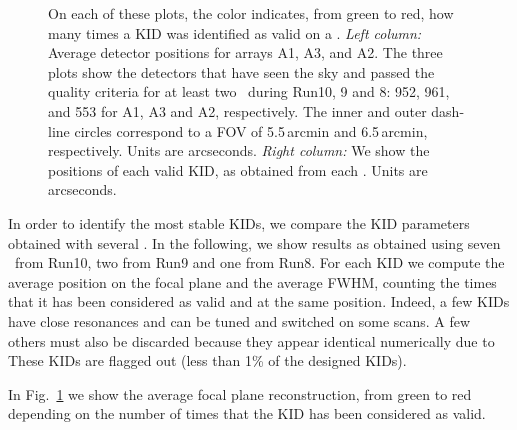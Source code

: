 \begin{figure}[p]
\begin{center}
\caption[KID selection and stability of position in the FOV]{On each of these
  plots, the color indicates, from green to red, how many times a KID was
  identified as valid on a \bm. \emph{Left column:} Average detector positions
  for arrays A1, A3, and A2. The three plots show the detectors that have seen
  the sky and passed the quality criteria for at least two \bms\ during Run10, 9
  and 8: 952, 961, and 553 for A1, A3 and A2, respectively. The inner and outer
  dash-line circles correspond to a FOV of 5.5\,arcmin and 6.5\,arcmin,
  respectively. Units are arcseconds. \emph{Right column:} We show the
  positions of each valid KID, as obtained from each \bm.  Units are arcseconds.}
\label{fig:avg_fov_color}
\end{center}
\end{figure}

In order to identify the most stable KIDs, we compare the KID parameters
obtained with several \bms.  In the following, we show results as obtained using
seven \bms\ from Run10, two from Run9 and one from Run8.  For each KID we
compute the average position on the focal plane and the average FWHM, counting
the times that it has been considered as valid and at the same position. Indeed,
a few KIDs have close resonances and can be tuned and switched on some scans. A
few others must also be discarded because they appear identical numerically due
to 
These KIDs are flagged out (less than 1\% of the designed KIDs).

In Fig.~\ref{fig:avg_fov_color} we show the
average focal plane reconstruction, from green to red depending on the number of
times that the KID has been considered as valid.

